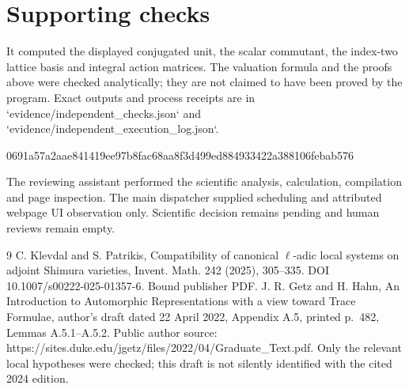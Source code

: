 \documentclass[10pt]{article}
\begin{document}
\section*{Supporting checks}
It computed the displayed conjugated unit, the scalar commutant, the index-two lattice basis and integral action matrices. The valuation formula and the proofs above were checked analytically; they are not claimed to have been proved by the program. Exact outputs and process receipts are in `evidence/independent\_checks.json` and `evidence/independent\_execution\_log.json`.\par
0691a57a2aae841419ee97b8fac68aa8f3d499ed884933422a388106febab576\par
The reviewing assistant performed the scientific analysis, calculation, compilation and page inspection. The main dispatcher supplied scheduling and attributed webpage UI observation only. Scientific decision remains pending and human reviews remain empty.\par
9 C. Klevdal and S. Patrikis, Compatibility of canonical \(\ell\)-adic local systems on adjoint Shimura varieties, Invent. Math. 242 (2025), 305–335. DOI 10.1007/s00222-025-01357-6. Bound publisher PDF. J. R. Getz and H. Hahn, An Introduction to Automorphic Representations with a view toward Trace Formulae, author’s draft dated 22 April 2022, Appendix A.5, printed p. 482, Lemmas A.5.1–A.5.2. Public author source: https://sites.duke.edu/jgetz/files/2022/04/Graduate\_Text.pdf. Only the relevant local hypotheses were checked; this draft is not silently identified with the cited 2024 edition.\par
\end{document}
